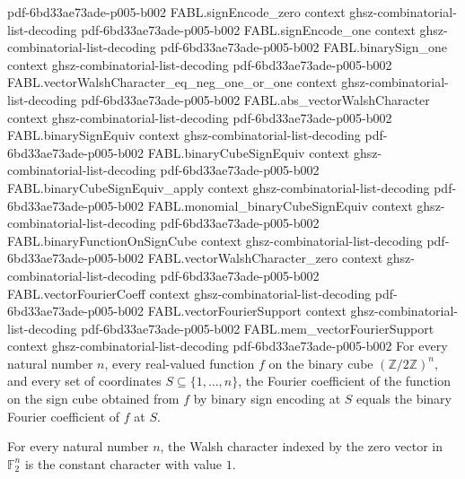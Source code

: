 \begin{theorem}
  {pdf-6bd33ae73ade-p005-b002}
\proofstep
  {FABL.signEncode_zero}
  {context}
  {ghsz-combinatorial-list-decoding}
  {pdf-6bd33ae73ade-p005-b002}
\proofstep
  {FABL.signEncode_one}
  {context}
  {ghsz-combinatorial-list-decoding}
  {pdf-6bd33ae73ade-p005-b002}
\proofstep
  {FABL.binarySign_one}
  {context}
  {ghsz-combinatorial-list-decoding}
  {pdf-6bd33ae73ade-p005-b002}
\proofstep
  {FABL.vectorWalshCharacter_eq_neg_one_or_one}
  {context}
  {ghsz-combinatorial-list-decoding}
  {pdf-6bd33ae73ade-p005-b002}
\proofstep
  {FABL.abs_vectorWalshCharacter}
  {context}
  {ghsz-combinatorial-list-decoding}
  {pdf-6bd33ae73ade-p005-b002}
\proofstep
  {FABL.binarySignEquiv}
  {context}
  {ghsz-combinatorial-list-decoding}
  {pdf-6bd33ae73ade-p005-b002}
\proofstep
  {FABL.binaryCubeSignEquiv}
  {context}
  {ghsz-combinatorial-list-decoding}
  {pdf-6bd33ae73ade-p005-b002}
\proofstep
  {FABL.binaryCubeSignEquiv_apply}
  {context}
  {ghsz-combinatorial-list-decoding}
  {pdf-6bd33ae73ade-p005-b002}
\proofstep
  {FABL.monomial_binaryCubeSignEquiv}
  {context}
  {ghsz-combinatorial-list-decoding}
  {pdf-6bd33ae73ade-p005-b002}
\proofstep
  {FABL.binaryFunctionOnSignCube}
  {context}
  {ghsz-combinatorial-list-decoding}
  {pdf-6bd33ae73ade-p005-b002}
\proofstep
  {FABL.vectorWalshCharacter_zero}
  {context}
  {ghsz-combinatorial-list-decoding}
  {pdf-6bd33ae73ade-p005-b002}
\proofstep
  {FABL.vectorFourierCoeff}
  {context}
  {ghsz-combinatorial-list-decoding}
  {pdf-6bd33ae73ade-p005-b002}
\proofstep
  {FABL.vectorFourierSupport}
  {context}
  {ghsz-combinatorial-list-decoding}
  {pdf-6bd33ae73ade-p005-b002}
\proofstep
  {FABL.mem_vectorFourierSupport}
  {context}
  {ghsz-combinatorial-list-decoding}
  {pdf-6bd33ae73ade-p005-b002}
For every natural number $n$, every real-valued function $f$ on the binary cube
$(\mathbb{Z}/2\mathbb{Z})^n$, and every set of coordinates $S\subseteq\{1,\ldots,n\}$,
the Fourier coefficient of the function on the sign cube obtained from $f$ by binary
sign encoding at $S$ equals the binary Fourier coefficient of $f$ at $S$.
\end{theorem}

\begin{theorem}
\label{FABL.vectorWalshCharacter_zero}
\leanok
{}
For every natural number $n$, the Walsh character indexed by the zero vector in $\mathbb
F_2^n$ is the constant character with value $1$.
\end{theorem}

